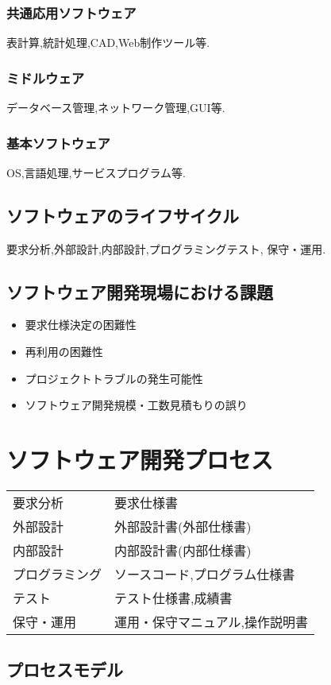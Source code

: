 \documentclass[8pt,twocolumn]{jsarticle}
\begin{document}
\subsubsection*{共通応用ソフトウェア}
表計算,統計処理,CAD,Web制作ツール等.
\subsubsection{ミドルウェア}
データベース管理,ネットワーク管理,GUI等.
\subsubsection{基本ソフトウェア}
OS,言語処理,サービスプログラム等.
\subsection{ソフトウェアのライフサイクル}
要求分析,外部設計,内部設計,プログラミングテスト,
保守・運用.
\subsection{ソフトウェア開発現場における課題}
\begin{itemize}
		\item 要求仕様決定の困難性
		\item 再利用の困難性
		\item プロジェクトトラブルの発生可能性
		\item ソフトウェア開発規模・工数見積もりの誤り
\end{itemize}
\section{ソフトウェア開発プロセス}
\begin{table}[htbp]
		\begin{tabular}{l|l}
				要求分析&要求仕様書\\
				外部設計&外部設計書(外部仕様書)\\
				内部設計&内部設計書(内部仕様書)\\
				プログラミング&ソースコード,プログラム仕様書\\
				テスト&テスト仕様書,成績書\\
				保守・運用&運用・保守マニュアル,操作説明書\\
		\end{tabular}
\end{table}
\subsection{プロセスモデル}
\end{document}
